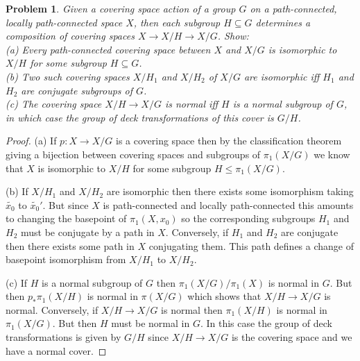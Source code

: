\documentclass{article}
\newtheorem{problem}{Problem}
\begin{document}
\begin{problem}
Given a covering space action of a group $G$ on a path-connected, locally path-connected space $X$, then each subgroup $H \subseteq G$ determines a composition of covering spaces $X \to X/H \to X/G$. Show:\\
(a) Every path-connected covering space between $X$ and $X/G$ is isomorphic to $X/H$ for some subgroup $H \subseteq G$.\\
(b) Two such covering spaces $X/H_1$ and $X/H_2$ of $X/G$ are isomorphic iff $H_1$ and $H_2$ are conjugate subgroups of $G$.\\
(c) The covering space $X/H \to X/G$ is normal iff $H$ is a normal subgroup of $G$, in which case the group of deck transformations of this cover is $G/H$.
\end{problem}
\begin{proof}
(a) If $p : X \to X/G$ is a covering space then by the classification theorem giving a bijection between covering spaces and subgroups of $\pi_1(X/G)$ we know that $X$ is isomorphic to $X/H$ for some subgroup $H \leq \pi_1(X/G)$.

(b) If $X/H_1$ and $X/H_2$ are isomorphic then there exists some isomorphism taking $\widetilde{x_0}$ to $\widetilde{x_0}'$. But since $X$ is path-connected and locally path-connected this amounts to changing the basepoint of $\pi_1(X,x_0)$ so the corresponding subgroups $H_1$ and $H_2$ must be conjugate by a path in $X$. Conversely, if $H_1$ and $H_2$ are conjugate then there exists some path in $X$ conjugating them. This path defines a change of basepoint isomorphism from $X/H_1$ to $X/H_2$.

(c) If $H$ is a normal subgroup of $G$ then $\pi_1(X/G)/\pi_1(X)$ is normal in $G$. But then $p_*\pi_1(X/H)$ is normal in $\pi(X/G)$ which shows that $X/H \to X/G$ is normal. Conversely, if $X/H \to X/G$ is normal then $\pi_1(X/H)$ is normal in $\pi_1(X/G)$. But then $H$ must be normal in $G$. In this case the group of deck transformations is given by $G/H$ since $X/H \to X/G$ is the covering space and we have a normal cover.
\end{proof}
\end{document}

